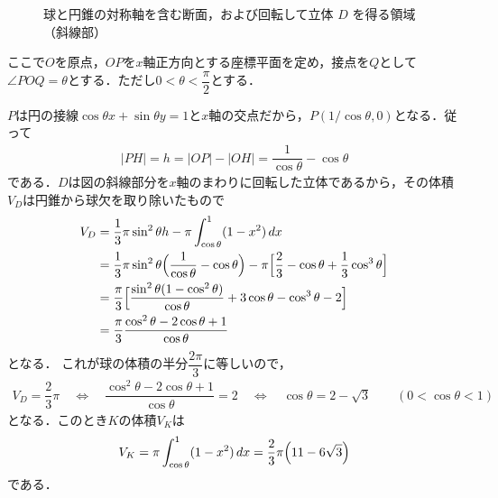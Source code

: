 \documentclass[../main.tex]{subfiles}
\begin{document}
\begin{figure}[htb]
  \caption{球と円錐の対称軸を含む断面，および回転して立体 $D$ を得る領域（斜線部）}
  \label{fig:sphere_cone_section}
\end{figure}

ここで$O$を原点，$OP$を$x$軸正方向とする座標平面を定め，接点を$Q$として$\angle POQ=\theta$とする．ただし$0<\theta<\dfrac{\pi}{2}$とする．

$P$は円の接線$\cos\theta x+\sin\theta y=1$と$x$軸の交点だから，$P(1/\cos\theta,0)$となる．従って
\begin{align}
  |PH| = h = |OP| - |OH| =\dfrac{1}{\cos\theta}-\cos\theta \label{eq:1}
\end{align}
である．$D$は図の斜線部分を$x$軸のまわりに回転した立体であるから，その体積$V_D$は円錐から球欠を取り除いたもので
\begin{align}
  V_D
  &=\dfrac{1}{3}\pi \sin^2\theta h-\pi\int_{\cos\theta}^{1}(1-x^2)\,dx\\
  &=\dfrac{1}{3}\pi \sin^2\theta \Bigl(\dfrac{1}{\cos\theta}-\cos\theta\Bigr)
  -\pi\Bigl[\dfrac{2}{3}-\cos\theta+\dfrac{1}{3}\cos^3\theta\Bigr]\\
  &=\dfrac{\pi}{3}\Bigl[\dfrac{\sin^2\theta(1-\cos^2\theta)}{\cos\theta}+3\cos\theta-\cos^3\theta-2\Bigr]\\
  &=\dfrac{\pi}{3}\dfrac{\cos^2\theta-2\cos\theta+1}{\cos\theta} \label{eq:2}
\end{align}
となる．
これが球の体積の半分$\dfrac{2\pi}{3}$に等しいので，
\begin{align}
  V_D=\dfrac{2}{3}\pi
  \quad\Longleftrightarrow\quad
  \dfrac{\cos^2\theta-2\cos\theta+1}{\cos\theta}=2
  \quad\Longleftrightarrow\quad
  \cos\theta=2-\sqrt{3}\qquad(0<\cos\theta<1) \label{eq:3}
\end{align}
となる．このとき$K$の体積$V_K$は
\begin{align}
  V_K=\pi\int_{\cos\theta}^{1}(1-x^2)\,dx
  =\dfrac{2}{3}\pi\Bigl(11-6\sqrt{3}\Bigr)
\end{align}
である．
\end{document}
